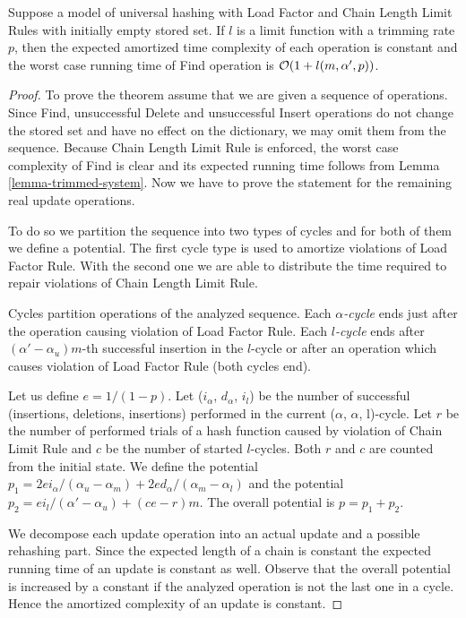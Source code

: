 \begin{theorem}
\label{theorem-amortised-expected-time}
Suppose a model of universal hashing with Load Factor and Chain Length Limit Rules with initially empty stored set. If $l$ is a limit function with a trimming rate $p$, then the expected amortized time complexity of each operation is constant and the worst case running time of Find operation is $\mathcal{O}(1 + l(m, \alpha', p))$.
\end{theorem}
\begin{proof}
To prove the theorem assume that we are given a sequence of operations. Since Find, unsuccessful Delete and unsuccessful Insert operations do not change the stored set and have no effect on the dictionary, we may omit them from the sequence. Because Chain Length Limit Rule is enforced, the worst case complexity of Find is clear and its expected running time follows from Lemma \ref{lemma-trimmed-system}. Now we have to prove the statement for the remaining real update operations.

To do so we partition the sequence into two types of cycles and for both of them we define a potential. The first cycle type is used to amortize violations of Load Factor Rule. With the second one we are able to distribute the time required to repair violations of Chain Length Limit Rule.

\begin{definition}
Cycles partition operations of the analyzed sequence.
Each \emph{$\alpha$-cycle} ends just after the operation causing violation of Load Factor Rule.
Each \emph{$l$-cycle} ends after $(\alpha'-\alpha_u)m$-th successful insertion in the $l$-cycle or after an operation which causes violation of Load Factor Rule (both cycles end).
\end{definition}

Let us define $e = 1/(1-p)$. Let ($i_{\alpha}$, $d_\alpha$, $i_l$) be the number of successful (insertions, deletions, insertions) performed in the current ($\alpha$, $\alpha$, l)-cycle. Let $r$ be the number of performed trials of a hash function caused by violation of Chain Limit Rule and $c$ be the number of started $l$-cycles. Both $r$ and $c$ are counted from the initial state. We define the potential $p_1 = {2ei_{\alpha}}/{(\alpha_u - \alpha_m)} + {2ed_{\alpha}}/{(\alpha_m - \alpha_l)}$ and the potential $p_2 = {ei_{l}}/{(\alpha' - \alpha_u)} + (ce - r) m$.  The overall potential is $p = p_1 + p_2$.

We decompose each update operation into an actual update and a possible rehashing part. Since the expected length of a chain is constant the expected running time of an update is constant as well. Observe that the overall potential is increased by a constant if the analyzed operation is not the last one in a cycle. Hence the amortized complexity of an update is constant. 


\end{proof}
